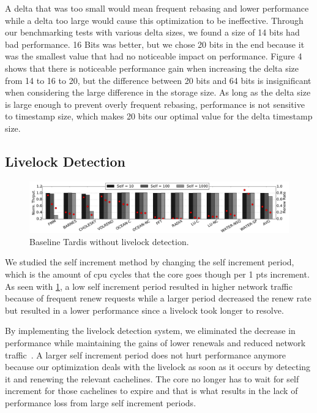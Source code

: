 \documentclass[12pt]{article}
\begin{document}
A delta that was too small would mean frequent rebasing and lower 
performance while a delta too large would cause this optimization to 
be ineffective. Through our benchmarking tests with various delta 
sizes, we found a size of 14 bits had bad performance. 16 Bits was 
better, but we chose 20 bits in the end because it was the smallest 
value that had no noticeable impact on performance. Figure 4 shows 
that  there is noticeable performance gain when increasing the delta 
size from 14 to 16 to 20, but the difference between 20 bits and 64 
bits is insignificant when considering the large difference in the 
storage size. As long as the delta size is large enough to prevent 
overly frequent rebasing, performance is not sensitive to timestamp 
size, which makes 20 bits our optimal value for the delta timestamp 
size.

\subsection{Livelock Detection}

\begin{figure}
	\centering
	\includegraphics[width=0.95\columnwidth]{figs/selfincr_nolive.pdf}
	\caption{ Baseline Tardis without livelock detection. }
	\label{fig:self-nolive}
\end{figure}

We studied the self increment method by changing the self increment 
period, which is the amount of cpu cycles that the core goes though 
per 1 pts increment. As seen with \cref{fig:self-nolive}, a low self 
increment period resulted in higher network traffic because of 
frequent renew requests while a larger period decreased the renew rate 
but resulted in a lower performance since a livelock took longer to 
resolve.  
  
  
By implementing the livelock detection system, we eliminated the 
decrease in performance while maintaining the gains of lower renewals 
and reduced network traffic~\cite{fig:self-live}.  A larger self 
increment period does not hurt performance anymore because our 
optimization deals with the livelock as soon as it occurs by detecting 
it and renewing the relevant cachelines. The core no longer has to 
wait for self increment for those cachelines to expire and that is 
what results in the lack of performance loss from large self increment 
periods.
\end{document}
